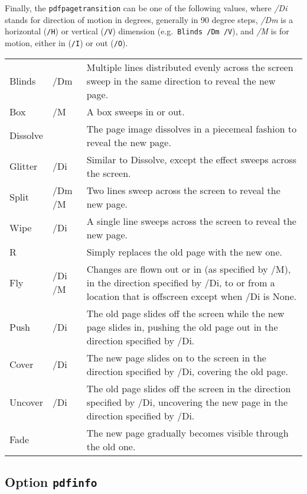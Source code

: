 \documentclass{article}
\begin{document}
Finally, the \texttt{pdfpagetransition} can be one of the following values, 
where \textit{/Di} stands for direction of motion in degrees, generally in 90 
degree steps, \textit{/Dm} is a horizontal (\texttt{/H}) or vertical 
(\texttt{/V}) dimension (e.g.\ \texttt{Blinds /Dm /V}), and \textit{/M} is 
for motion, either in (\texttt{/I}) or out (\texttt{/O}). 

\begin{longtable}{@{}>{\ttfamily}llp{8.5cm}@{}}
Blinds   & /Dm    & Multiple lines distributed evenly across the screen sweep in the same direction to reveal the new
                    page. \\
Box      & /M     & A box sweeps in or out. \\
Dissolve &        & The page image dissolves in a piecemeal fashion to reveal the new page. \\
Glitter  & /Di    & Similar to Dissolve, except the effect sweeps across the screen. \\
Split    & /Dm /M & Two lines sweep across the screen to reveal the new page. \\
Wipe     & /Di    & A single line sweeps across the screen to reveal the new page. \\
R        &        & Simply replaces the old page with the new one. \\
Fly      & /Di /M & Changes are flown out or in (as specified by /M), in the direction
                    specified by /Di, to or from a location that is
                    offscreen except when /Di is None. \\
Push     & /Di    & The old page slides off the screen while the new page slides in,
                    pushing the old page out in the direction
                    specified by /Di. \\
Cover    & /Di    & The new page slides on to the screen in the direction specified
                    by /Di, covering the old page. \\
Uncover  & /Di    & The old page slides off the screen in the direction specified by
                    /Di, uncovering the new page in the direction
                    specified by /Di. \\
Fade     &        & The new page gradually becomes visible through the old one.

\end{longtable}

\subsection{Option \texttt{pdfinfo}}
\end{document}
